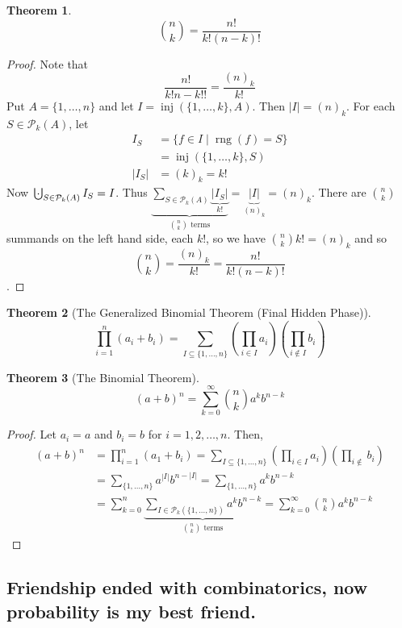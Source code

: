 \documentclass{article}
\DeclareMathOperator{\inj}{inj}
\DeclareMathOperator{\rng}{rng}
\newcommand{\bigcupdot}{\mathop{\mathchoice{\hspace{0.45em}}{\hspace{0.35em}}{}{}\cdot\mathchoice{\hspace{-0.85em}}{\hspace{-0.725em}}{}{}\bigcup\limits}}
\newcommand{\p}[1]{\left(#1\right)} %
\newcommand{\factorial}[1]{#1!}
\theoremstyle{definition}
\newtheorem{theorem}{Theorem}
\begin{document}
\begin{theorem}
$$\binom{n}{k} = \frac{n!}{k!(n - k)!}$$
\end{theorem}
\begin{proof}
    Note that $$\frac{\factorial{n}}{\factorial{k}\factorial{n-k}!} = \frac{(n)_k}{k!}  $$
    Put $A = \{1, \ldots, n\}$ and let $I = \inj(\{1, \ldots, k\}, A)$. Then $|I| = (n)_k$.
    For each $S \in \mathcal{P}_k(A)$, let
    \begin{align*}
        I_S &= \{f \in I \mid \rng(f) = S\} \\
            &= \inj(\{1, \ldots, k\}, S) \\
        |I_S| &= (k)_k = k!
    \end{align*}
    Now $\bigcupdot_{S \in \mathcal{P}_k(A)} I_S = I$. Thus $\underbrace{\sum_{S \in \mathcal{P}_k(A)} \underbrace{|I_S|}_{k!}}_{\binom{n}{k}\text{ terms}} = \underbrace{|I|}_{(n)_{k}} = (n)_k$.
    There are $\binom{n}{k}$ summands on the left hand side, each $k!$, so we have $\binom{n}{k}k! = (n)_k$ and so $$\binom{n}{k} = \frac{(n)_k}{k!} = \frac{n!}{k!(n-k)!}$$.
\end{proof}

\begin{theorem}[The Generalized Binomial Theorem (Final Hidden Phase)]
$$\prod_{i=1}^n(a_i + b_i) = \sum_{I\subseteq\{1,\dots,n\}}\p{\prod_{i\in I}a_i}\p{\prod_{i\not\in I}b_i}$$
\end{theorem}
\begin{theorem}[The Binomial Theorem]
    $$(a+b)^n = \sum_{k=0}^\infty \binom{n}{k} a^k b^{n-k}$$
\end{theorem}
\begin{proof}
    Let $a_i = a$ and $b_i = b$ for $i = 1,2,\dots, n$. Then,
    \begin{align*}
        (a+b)^n &= \prod_{i=1}^n(a_1 + b_i) = \sum_{I \subseteq \{1, \ldots, n\}}\p{\prod_{i \in I} a_i}\p{\prod_{i\notin} b_i} \\
            &= \sum_{\{1, \ldots, n\}} a^{|I|}b^{n-|I|} = \sum_{\{1, \ldots, n\}} a^{k}b^{n-k} \\
            &= \sum_{k=0}^n \underbrace{\sum_{I \in \mathcal{P}_k (\{1, \ldots, n\})} a^{k}b^{n-k}}_{{\binom{n}{k}} \text{ terms}} = \sum_{k=0}^\infty \binom{n}{k} a^k b^{n-k}
    \end{align*}
\end{proof}

\subsection*{Friendship ended with combinatorics, now probability is my best friend.}
\end{document}
